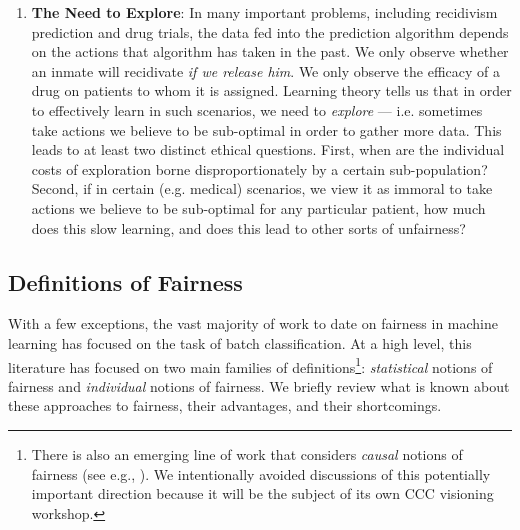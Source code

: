 \begin{enumerate}
\item \textbf{The Need to Explore}: In many important problems, including recidivism prediction and drug trials, the data fed into the prediction algorithm depends on the actions that algorithm has taken in the past. We only observe whether an inmate will recidivate \emph{if we release him}. We only observe the efficacy of a drug on patients to whom it is assigned. Learning theory tells us that in order to effectively learn in such scenarios, we need to \emph{explore} --- i.e. sometimes take actions we believe to be sub-optimal in order to gather more data. This leads to at least two distinct ethical questions. First, when are the individual costs of exploration borne disproportionately by a certain sub-population? Second, if in certain (e.g. medical) scenarios, we view it as immoral to take actions we believe to be sub-optimal for any particular patient, how much does this slow learning, and does this lead to other sorts of unfairness?
\end{enumerate}

\subsection{Definitions of Fairness}
With a few exceptions, the vast majority of work to date on fairness in machine learning has focused on the task of batch classification. At a high level, this literature has focused on two main families of definitions\footnote{There is also an emerging line of work that considers \emph{causal} notions of fairness (see e.g., \cite{kilbertus2017avoiding, kusner2017counterfactual, nabi2018fair}). We intentionally avoided discussions of this potentially important direction because it will be the subject of its own CCC visioning workshop.}: \emph{statistical} notions of fairness and \emph{individual} notions of fairness.  We briefly review what is known about these approaches to fairness, their advantages, and their shortcomings.

